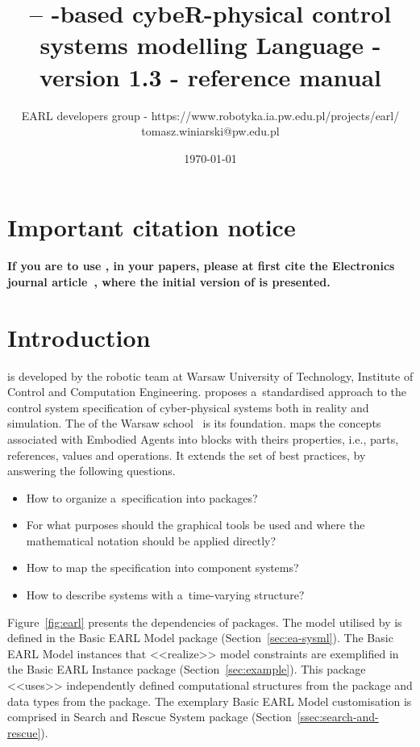 \documentclass[11pt,oneside,a4paper]{article}
\newcommand{\Figure}[0]{Figure}
\begin{document}
	
	\title{\EARL{} -- \EmbodiedAgent{}-based cybeR-physical control systems modelling Language - version 1.3 - reference manual}
	\author{EARL developers group - https://www.robotyka.ia.pw.edu.pl/projects/earl/ \\ tomasz.winiarski@pw.edu.pl}
	\date{\today}
	\maketitle
	
	\section*{Important citation notice}
	
	\textbf{If you are to use \EARL{}, in your papers, please at first cite the Electronics journal article~\cite{earl2020}, where the initial version of \EARL{} is presented.}
	
	\section{Introduction}
	\label{sec:intro}
	
	\EARL{} is developed by the robotic team at Warsaw University of Technology, Institute of Control and Computation Engineering.
	\EARL{} proposes a~standardised approach to the control system specification of cyber-physical systems both in reality and simulation.
	The \EmbodiedAgent{} of the Warsaw school~\cite{kornuta-bpan-2020} is its foundation.
	\EARL{} maps the concepts associated with Embodied Agents into \SysML{} blocks with theirs properties, i.e., parts, references, values and operations.
	 It extends the set of best practices, by answering the following questions.
	\begin{itemize}
		\item How to organize a~specification into \SysML{} packages?
		\item For what purposes should the graphical tools be used and where the mathematical notation should be applied directly?
		\item How to map the specification into component systems?
		\item How to describe systems with a~time-varying structure?
	\end{itemize}
	
	
	\Figure{}~\ref{fig:earl} presents the dependencies of \EARL{} packages.
	The model utilised by \EARL{} is defined in the Basic EARL Model package (Section~\ref{sec:ea-sysml}).
	The Basic EARL Model instances that <<realize>> \EARL{} model constraints are exemplified in the Basic EARL Instance package (Section~\ref{sec:example}).
	This package <<uses>> independently defined computational structures from the \CalculationComponentspkg{} package and data types from the \ManipulationRobotValueTypes{} package. The exemplary Basic EARL Model customisation is comprised in Search and Rescue System package (Section~\ref{ssec:search-and-rescue}).
		
\end{document}
